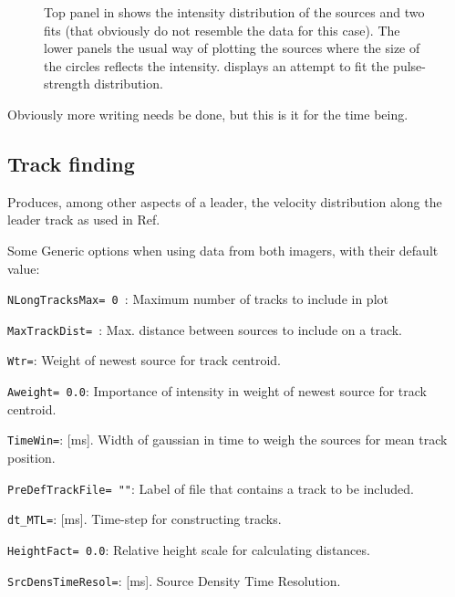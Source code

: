 \begin{figure}[h]
	\caption{Top panel in  shows the intensity distribution of the sources and two fits (that obviously do not resemble the data for this case). The lower panels the usual way of plotting the sources where the size of the circles reflects the intensity.
 displays an attempt to fit the pulse-strength distribution.}	 
\end{figure}

Obviously more writing needs be done, but this is it for the time being.

\subsection{Track finding}

Produces, among other aspects of a leader, the velocity distribution along the leader track as used in Ref.~\cite{Scholten:2021-RNL}

Some Generic options when using data from both imagers, with their default value:
\begin{enumerate*}
\item \verb!NLongTracksMax= 0 !: Maximum number of tracks to include in plot
\item \verb!MaxTrackDist= !: Max. distance between sources to include on a track.
\item \verb!Wtr=!: Weight of newest source for track centroid.
\item \verb!Aweight= 0.0!: Importance of intensity in weight of newest source for track centroid.
\item \verb!TimeWin=!: [ms]. Width of gaussian in time to weigh the sources for mean track position.
\item \verb!PreDefTrackFile= ""!: Label of file that contains a track to be included.
\item \verb!dt_MTL=!: [ms]. Time-step for constructing tracks.
\item \verb!HeightFact= 0.0!: Relative height scale for calculating distances.
\item \verb!SrcDensTimeResol=!: [ms]. Source Density Time Resolution.
\end{enumerate*}


